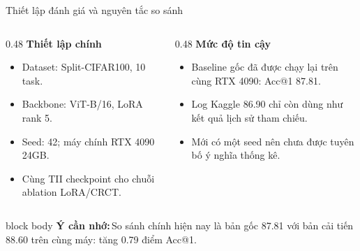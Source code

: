 \documentclass[aspectratio=169,10pt]{beamer}
\newcommand{\remember}[1]{%
  \par\vspace{0.12cm}%
  \begin{beamercolorbox}[wd=\linewidth,sep=0.11cm,leftskip=0.08cm,rightskip=0.08cm,rounded=true]{block body}
    \footnotesize\textbf{\color{HRMBlue}Ý cần nhớ:}\,\color{HRMDark}#1
  \end{beamercolorbox}
}
\begin{document}
\begin{frame}{Thiết lập đánh giá và nguyên tắc so sánh}
  \begin{columns}[T,onlytextwidth]
    \begin{column}{0.48\textwidth}
      {\large\bfseries Thiết lập chính}\par\vspace{0.2cm}
      \begin{itemize}\setlength\itemsep{0.22cm}
        \item Dataset: Split-CIFAR100, 10 task.
        \item Backbone: ViT-B/16, LoRA rank 5.
        \item Seed: 42; máy chính RTX 4090 24GB.
        \item Cùng TII checkpoint cho chuỗi ablation LoRA/CRCT.
      \end{itemize}
    \end{column}
    \begin{column}{0.48\textwidth}
      {\large\bfseries Mức độ tin cậy}\par\vspace{0.2cm}
      \begin{itemize}\setlength\itemsep{0.22cm}
        \item Baseline gốc đã được chạy lại trên cùng RTX 4090: Acc@1 87.81.
        \item Log Kaggle 86.90 chỉ còn dùng như kết quả lịch sử tham chiếu.
        \item Mới có một seed nên chưa được tuyên bố ý nghĩa thống kê.
      \end{itemize}
    \end{column}
  \end{columns}
  \remember{So sánh chính hiện nay là bản gốc 87.81 với bản cải tiến 88.60 trên cùng máy: tăng 0.79 điểm Acc@1.}
\end{frame}
\end{document}
